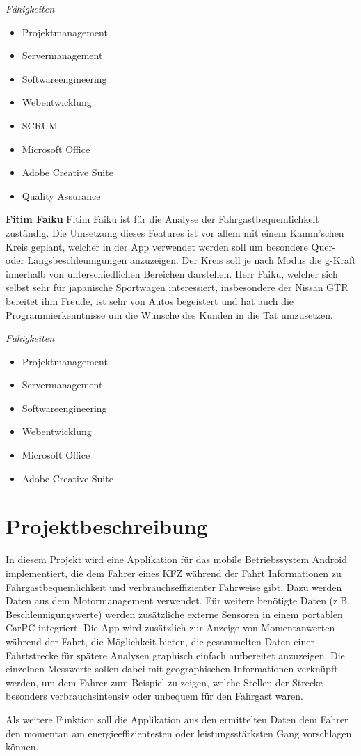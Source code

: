 \textit{Fähigkeiten}
\begin{itemize}
	\item Projektmanagement
	\item Servermanagement				
	\item Softwareengineering
	\item Webentwicklung
	\item SCRUM
	\item Microsoft Office
	\item Adobe Creative Suite
	\item Quality Assurance
\end{itemize}

\textbf{Fitim Faiku}
Fitim Faiku ist für die Analyse der Fahrgastbequemlichkeit zuständig. Die Umsetzung dieses Features ist vor allem mit einem Kamm'schen Kreis geplant, welcher in der App verwendet werden soll um besondere Quer- oder Längsbeschleunigungen anzuzeigen. Der Kreis soll je nach Modus die g-Kraft innerhalb von unterschiedlichen Bereichen darstellen. 
Herr Faiku, welcher sich selbst sehr für japanische Sportwagen interessiert, insbesondere der Nissan GTR bereitet ihm Freude, ist sehr von Autos begeistert und hat auch die Programmierkenntnisse um die Wünsche des Kunden in die Tat umzusetzen. 

\textit{Fähigkeiten}
\begin{itemize}
	\item Projektmanagement
	\item Servermanagement				
	\item Softwareengineering
	\item Webentwicklung
	\item Microsoft Office
	\item Adobe Creative Suite
\end{itemize}

\section{Projektbeschreibung}
In diesem Projekt wird eine Applikation für das mobile Betriebssystem Android implementiert, die dem Fahrer eines KFZ während der Fahrt Informationen zu Fahrgastbequemlichkeit und verbrauchseffizienter Fahrweise gibt. Dazu werden Daten aus dem Motormanagement verwendet. Für weitere benötigte Daten (z.B. Beschleunigungswerte) werden zusätzliche externe Sensoren in einem portablen CarPC integriert. Die App wird zusätzlich zur Anzeige von Momentanwerten während der Fahrt, die Möglichkeit bieten, die gesammelten Daten einer Fahrtstrecke für spätere Analysen graphisch einfach aufbereitet anzuzeigen. Die einzelnen Messwerte sollen dabei mit geographischen Informationen verknüpft werden, um dem Fahrer zum Beispiel zu zeigen, welche Stellen der Strecke besonders verbrauchsintensiv oder unbequem für den Fahrgast waren. 

Als weitere Funktion soll die Applikation aus den ermittelten Daten dem Fahrer den momentan am energieeffizientesten oder leistungsstärksten Gang vorschlagen können.
